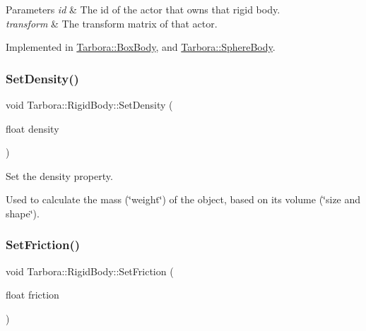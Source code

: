\begin{DoxyParams}{Parameters}
{\em id} & The id of the actor that owns that rigid body. \\
\hline
{\em transform} & The transform matrix of that actor. \\
\hline
\end{DoxyParams}


Implemented in \hyperlink{classTarbora_1_1BoxBody_a9030e38449087fdf091d9daea5e6efbe}{Tarbora\+::\+Box\+Body}, and \hyperlink{classTarbora_1_1SphereBody_aa4c177c62075afa568b73ec019201dd7}{Tarbora\+::\+Sphere\+Body}.

\mbox{\label{classTarbora_1_1RigidBody_a154ac3b0b5f1e6da32ee6e02b65822d8}} 
\subsubsection{\texorpdfstring{Set\+Density()}{SetDensity()}}
{\footnotesize\ttfamily void Tarbora\+::\+Rigid\+Body\+::\+Set\+Density (\begin{DoxyParamCaption}\item[{float}]{density }\end{DoxyParamCaption})\hspace{0.3cm}{\ttfamily [inline]}}



Set the density property. 

Used to calculate the mass (\char`\"{}weight\char`\"{}) of the object, based on its volume (\char`\"{}size and shape\char`\"{}). \mbox{\label{classTarbora_1_1RigidBody_a9408bdeb536881e29f3706bb061220d2}} 
\subsubsection{\texorpdfstring{Set\+Friction()}{SetFriction()}}
{\footnotesize\ttfamily void Tarbora\+::\+Rigid\+Body\+::\+Set\+Friction (\begin{DoxyParamCaption}\item[{float}]{friction }\end{DoxyParamCaption})\hspace{0.3cm}{\ttfamily [inline]}}



